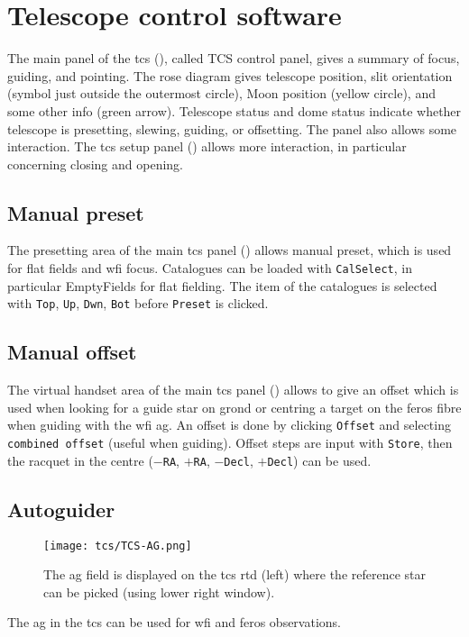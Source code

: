\documentclass[11pt,fleqn,a4paper]{book}
\begin{document}
\section{Telescope control software}

The main panel of the \gls{tcs} (), called \gls{TCS control panel}, gives a summary of \gls{focus},
guiding, and \gls{pointing}. The \gls{rose diagram} gives telescope position, \gls{slit}
orientation (symbol just outside the outermost circle), Moon position (yellow
circle), and some other info (green arrow). Telescope status and \gls{dome} status
indicate whether telescope is \gls{preset}ting, slewing, guiding, or offsetting.  The
panel also allows some interaction.  The \gls{tcs} setup panel
() allows more interaction, in particular concerning
closing and opening.

\subsection{Manual preset}  
\label{manualpreset}


The \gls{preset}ting area  of the main \gls{tcs} panel () allows manual
preset, which is used for flat fields and \gls{wfi} \gls{focus}.  Catalogues can be loaded
with \texttt{CalSelect}, in particular EmptyFields for flat fielding. The item
of the catalogues is selected with \texttt{Top}, \texttt{Up}, \texttt{Dwn},
\texttt{Bot} before \texttt{Preset} is clicked.

\subsection{Manual offset}
\label{manualoffset}

The virtual handset area of the main \gls{tcs} panel ()
allows to give an offset which is used when looking for a guide star on
\gls{grond} or centring a target on the \gls{feros} fibre when guiding with the
\gls{wfi} \gls{ag}.  An offset is done by clicking \texttt{Offset} and
selecting \texttt{combined offset} (useful when guiding).  Offset steps are
input with \texttt{Store}, then the racquet in the centre (\texttt{$-$RA},
\texttt{$+$RA}, \texttt{$-$Decl}, \texttt{$+$Decl}) can be used.

\subsection{Autoguider}
\label{autoguider}

\begin{figure}[!ht]
\centering
\texttt{[image: tcs/TCS-AG.png]}
\caption[WFI autoguider]{The \gls{ag} field is displayed on the \gls{tcs} \gls{rtd} (left) where the
 reference star can be picked (using lower right window).} 
\label{fig:tcsag}
\end{figure}
The \gls{ag} in the \gls{tcs} can be used for \gls{wfi} and \gls{feros} observations.
\end{document}
